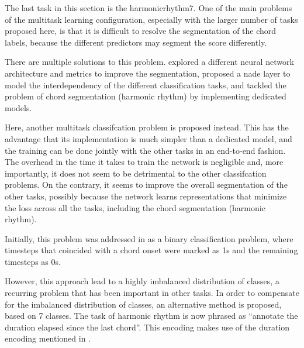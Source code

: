 
The last task in this section is the \gls{harmonicrhythm7}.
One of the main problems of the multitask learning
configuration, especially with the larger number of tasks
proposed here, is that it is difficult to resolve the
segmentation of the chord labels, because the different
predictors may segment the score differently.

There are multiple solutions to this problem.
\textcite{chen2021attend} explored a different neural
network architecture and metrics to improve the
segmentation, \textcite{micchi2021deep} proposed a
\gls{nade} layer to model the interdependency of the
different classification tasks, \textcite{mcleod2021modular}
and  \textcite{wu2021melody} tackled the problem of chord
segmentation (harmonic rhythm) by implementing dedicated
models. 

Here, another multitask classifcation problem is proposed
instead. This has the advantage that its implementation is
much simpler than a dedicated model, and the training can be
done jointly with the other tasks in an end-to-end fashion.
The overhead in the time it takes to train the network is
negligible and, more importantly, it does not seem to be
detrimental to the other classifcation problems. On the
contrary, it seems to improve the overall segmentation of
the other tasks, possibly because the network learns
representations that minimize the loss across all the tasks,
including the chord segmentation (harmonic rhythm).

Initially, this problem was addressed in
\textcite{napoleslopez2021augmentednet} as a binary
classification problem, where timesteps that coincided with
a chord onset were marked as 1s and the remaining timesteps
as 0s.

However, this approach lead to a highly imbalanced
distribution of classes, a recurring problem that has been
important in other tasks. In order to compensate for the
imbalanced distribution of classes, an alternative method is
proposed, based on 7 classes. The task of harmonic rhythm is
now phrased as ``annotate the duration elapsed since the
last chord''. This encoding makes use of the duration
encoding mentioned in .
